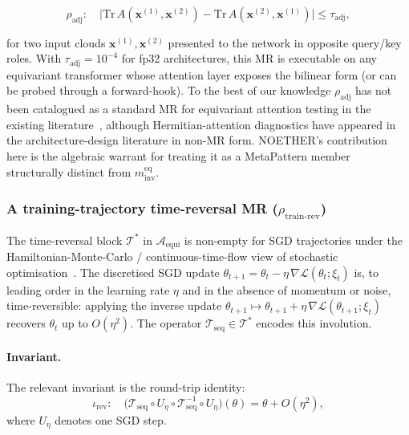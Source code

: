 \documentclass[acmsmall, screen]{acmart}
\begin{document}
\begin{equation}
\rho_{\mathrm{adj}}: \quad \big| \mathrm{Tr}\,A(\mathbf{x}^{(1)}, \mathbf{x}^{(2)}) - \mathrm{Tr}\,A(\mathbf{x}^{(2)}, \mathbf{x}^{(1)}) \big| \le \tau_{\mathrm{adj}},
\end{equation}

\noindent for two input clouds $\mathbf{x}^{(1)}, \mathbf{x}^{(2)}$ presented to the network in opposite query/key roles. With $\tau_{\mathrm{adj}} = 10^{-4}$ for fp32 architectures, this MR is executable on any equivariant transformer whose attention layer exposes the bilinear form (or can be probed through a forward-hook). To the best of our knowledge $\rho_{\mathrm{adj}}$ has not been catalogued as a standard MR for equivariant attention testing in the existing literature~\cite{Segura2016, MRScout2024, GenMorph2024}, although Hermitian-attention diagnostics have appeared in the architecture-design literature in non-MR form. NOETHER's contribution here is the algebraic warrant for treating it as a MetaPattern member structurally distinct from $m^{\mathrm{eq}}_{\mathrm{inv}}$.

\subsubsection{A training-trajectory time-reversal MR (\texorpdfstring{$\rho_{\mathrm{train\text{-}rev}}$}{rho\_train-rev})}
\label{subsec:rho-rev}

The time-reversal block $\mathcal{T}^{*}$ in $\mathcal{A}_{\mathrm{equi}}$ is non-empty for SGD trajectories under the Hamiltonian-Monte-Carlo / continuous-time-flow view of stochastic optimisation~\cite{ChenStein2014}. The discretised SGD update $\theta_{t+1} = \theta_t - \eta\,\nabla\mathcal{L}(\theta_t; \xi_t)$ is, to leading order in the learning rate $\eta$ and in the absence of momentum or noise, time-reversible: applying the inverse update $\theta_{t+1} \mapsto \theta_{t+1} + \eta\,\nabla\mathcal{L}(\theta_{t+1}; \xi_t)$ recovers $\theta_t$ up to $O(\eta^2)$. The operator $\mathcal{T}_{\mathrm{seq}} \in \mathcal{T}^{*}$ encodes this involution.

\paragraph{Invariant.} The relevant invariant is the round-trip identity:
$$\iota_{\mathrm{rev}}: \quad \big(\mathcal{T}_{\mathrm{seq}} \circ U_{\eta} \circ \mathcal{T}_{\mathrm{seq}}^{-1} \circ U_{\eta}\big)(\theta) = \theta + O(\eta^2),$$
where $U_{\eta}$ denotes one SGD step.
\end{document}
